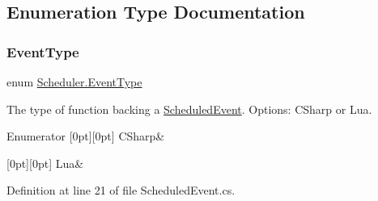 \subsection{Enumeration Type Documentation}
\mbox{\label{namespace_scheduler_a85a4e27de37756a9765a49f3b3e4ba81}} 
\subsubsection{\texorpdfstring{Event\+Type}{EventType}}
{\footnotesize\ttfamily enum \hyperlink{namespace_scheduler_a85a4e27de37756a9765a49f3b3e4ba81}{Scheduler.\+Event\+Type}\hspace{0.3cm}{\ttfamily [strong]}}



The type of function backing a \hyperlink{class_scheduler_1_1_scheduled_event}{Scheduled\+Event}. Options\+: C\+Sharp or Lua. 

\begin{DoxyEnumFields}{Enumerator}
[0pt][0pt]{}\mbox{\label{namespace_scheduler_a85a4e27de37756a9765a49f3b3e4ba81a83925001a044cdfe0c64e9a44345b66d}} 
C\+Sharp&\\
\hline

[0pt][0pt]{}\mbox{\label{namespace_scheduler_a85a4e27de37756a9765a49f3b3e4ba81a0ae9478a1db9d1e2c48efa49eac1c7c6}} 
Lua&\\
\hline

\end{DoxyEnumFields}


Definition at line 21 of file Scheduled\+Event.\+cs.

